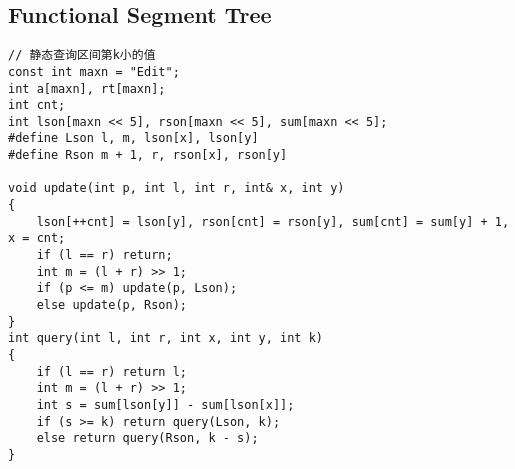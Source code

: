 \documentclass[twoside]{article}
\begin{document}
\subsection{Functional Segment Tree}
\begin{lstlisting}
// 静态查询区间第k小的值
const int maxn = "Edit";
int a[maxn], rt[maxn];
int cnt;
int lson[maxn << 5], rson[maxn << 5], sum[maxn << 5];
#define Lson l, m, lson[x], lson[y]
#define Rson m + 1, r, rson[x], rson[y]

void update(int p, int l, int r, int& x, int y)
{
    lson[++cnt] = lson[y], rson[cnt] = rson[y], sum[cnt] = sum[y] + 1, x = cnt;
    if (l == r) return;
    int m = (l + r) >> 1;
    if (p <= m) update(p, Lson);
    else update(p, Rson);
}
int query(int l, int r, int x, int y, int k)
{
    if (l == r) return l;
    int m = (l + r) >> 1;
    int s = sum[lson[y]] - sum[lson[x]];
    if (s >= k) return query(Lson, k);
    else return query(Rson, k - s);
}
\end{lstlisting}
\end{document}
